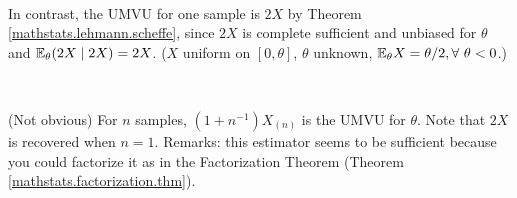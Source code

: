 \begin{example}
\

In contrast, the UMVU for one sample is \(2X\) by Theorem \ref{mathstats.lehmann.scheffe}, since \(2X\) is complete sufficient and unbiased for \(\theta\) and \(\E_\theta(2X \mid 2X) = 2X\). (\(X\) uniform on \([0, \theta]\), \(\theta\) unknown, \(\E_\theta X = \theta/2, \forall \ \theta < 0\).) 

\

(Not obvious) For \(n\) samples, \((1 + n^{-1}) X_{(n)}\) is the UMVU for \(\theta\). Note that \(2X\) is recovered when \(n=1\). Remarks: this estimator seems to be sufficient because you could factorize it as in the Factorization Theorem (Theorem \ref{mathstats.factorization.thm}). 

\end{example}



